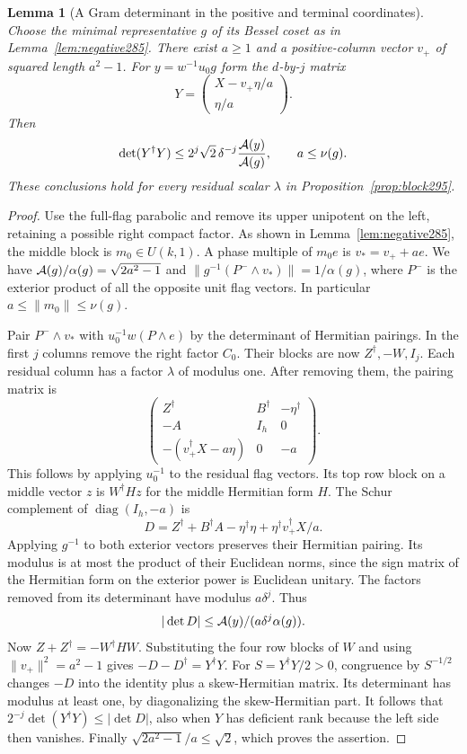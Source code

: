 \documentclass[a4paper,11pt]{article}
\newtheorem{lemma}[proposition]{Lemma}
\theoremstyle{definition}
\theoremstyle{remark}
\numberwithin{equation}{section}
\begin{document}
\begin{lemma}[A Gram determinant in the positive and terminal coordinates]\leavevmode
\label{lem:blockell296}
Choose the minimal representative \(g\) of its Bessel coset
as in Lemma~\ref{lem:negative285}. There exist \(a\ge1\) and
a positive-column vector \(v_+\) of squared length \(a^2-1\).
For \(y=w^{-1}u_0g\) form the \(d\)-by-\(j\) matrix
\[
               Y=\begin{pmatrix} X-v_+\eta/a\\ \eta/a\end{pmatrix}.
\]
Then
\[
 \det(Y^\dagger Y)\le
 2^j\sqrt{2}\,\delta^{-j}\frac{{\cal A}(y)}{{\cal A}(g)},
 \qquad a\le\nu(g).
\]
These conclusions hold for every residual scalar \(\lambda\)
in Proposition~\ref{prop:block295}.
\end{lemma}
\begin{proof}
Use the full-flag parabolic and remove its upper unipotent
on the left, retaining a possible right compact factor.
As shown in Lemma~\ref{lem:negative285}, the middle block is
\(m_0\in U(k,1)\). A phase multiple of \(m_0e\) is
\(v_*=v_++ae\). We have
\({\cal A}(g)/\alpha(g)=\sqrt{2a^2-1}\) and
\(\|g^{-1}(P^-\wedge v_*)\|=1/\alpha(g)\), where \(P^-\)
is the exterior product of all the opposite unit flag vectors.
In particular \(a\le\|m_0\|\le\nu(g)\).

Pair \(P^-\wedge v_*\) with \(u_0^{-1}w(P\wedge e)\)
by the determinant of Hermitian pairings. In the first \(j\)
columns remove the right factor \(C_0\). Their blocks are
now \(Z^\dagger,-W,I_j\). Each residual column has a factor
\(\lambda\) of modulus one. After removing them, the pairing
matrix is
\[
 \begin{pmatrix}
 Z^\dagger & B^\dagger &-\eta^\dagger\\
 -A & I_h &0\\
 -(v_+^\dagger X-a\eta)&0&-a
 \end{pmatrix}.
\]
This follows by applying \(u_0^{-1}\) to the residual flag
vectors. Its top row block on a middle vector \(z\) is
\(W^\dagger H z\) for the middle Hermitian form \(H\).
The Schur complement of \(\operatorname{diag}(I_h,-a)\) is
\[
 D=Z^\dagger+B^\dagger A-\eta^\dagger\eta
                                  +\eta^\dagger v_+^\dagger X/a.
\]
Applying \(g^{-1}\) to both exterior vectors preserves their
Hermitian pairing. Its modulus is at most the product of
their Euclidean norms, since the sign matrix of the Hermitian
form on the exterior power is Euclidean unitary. The factors
removed from its determinant have modulus \(a\delta^j\). Thus
\[
          |\det D|\le {\cal A}(y)/(a\delta^j\alpha(g)).
\]
Now \(Z+Z^\dagger=-W^\dagger H W\). Substituting the four
row blocks of \(W\) and using \(\|v_+\|^2=a^2-1\) gives
\(-D-D^\dagger=Y^\dagger Y\). For \(S=Y^\dagger Y/2>0\),
congruence by \(S^{-1/2}\) changes \(-D\) into the identity
plus a skew-Hermitian matrix. Its determinant has modulus at
least one, by diagonalizing the skew-Hermitian part. It follows
that \(2^{-j}\det(Y^\dagger Y)\le|\det D|\), also when \(Y\)
has deficient rank because the left side then vanishes. Finally
\(\sqrt{2a^2-1}/a\le\sqrt2\), which proves the assertion.
\end{proof}
\end{document}

